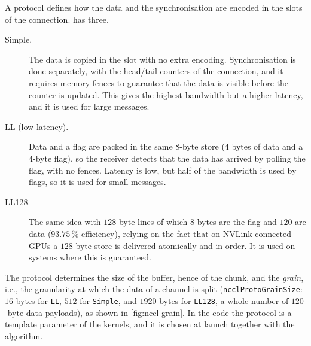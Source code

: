 A protocol defines how the data and the synchronisation are encoded in the slots of the connection.
\nccl{} has three.
\begin{description}
  \item[Simple.] The data is copied in the slot with no extra encoding.
  Synchronisation is done separately, with the head/tail counters of the connection, and it requires memory fences to guarantee that the data is visible before the counter is updated.
  This gives the highest bandwidth but a higher latency, and it is used for large messages.
  \item[LL (low latency).] Data and a flag are packed in the same $8$-byte store ($4$ bytes of data and a $4$-byte flag), so the receiver detects that the data has arrived by polling the flag, with no fences.
  Latency is low, but half of the bandwidth is used by flags, so it is used for small messages.
  \item[LL128.] The same idea with $128$-byte lines of which $8$ bytes are the flag and $120$ are data ($93.75\,\%$ efficiency), relying on the fact that on NVLink-connected GPUs a $128$-byte store is delivered atomically and in order.
  It is used on systems where this is guaranteed.
\end{description}
The protocol determines the size of the buffer, hence of the chunk, and the \emph{grain}, i.e., the granularity at which the data of a channel is split (\texttt{ncclProtoGrainSize}: $16$ bytes for \texttt{LL}, $512$ for \texttt{Simple}, and $1920$ bytes for \texttt{LL128}, a whole number of $120$-byte data payloads), as shown in \cref{fig:nccl-grain}.
In the code the protocol is a template parameter of the kernels, and it is chosen at launch together with the algorithm.

